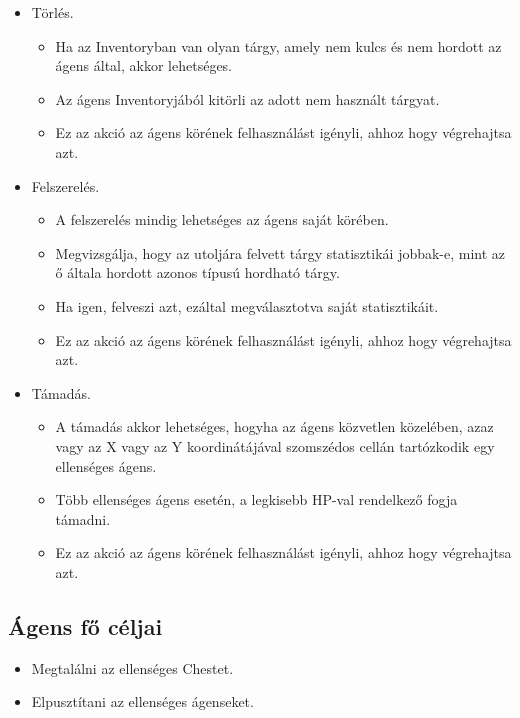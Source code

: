 \begin{itemize}
    \item Törlés. 
    
    \begin{itemize}
        \item Ha az Inventoryban van olyan tárgy, amely nem kulcs és nem hordott az ágens által, akkor lehetséges.
        \item Az ágens Inventoryjából kitörli az adott nem használt tárgyat.
        \item Ez az akció az ágens körének felhasználást igényli, ahhoz hogy végrehajtsa azt.
    \end{itemize}

    \item Felszerelés. 
    
    \begin{itemize}
        \item A felszerelés mindig lehetséges az ágens saját körében.
        \item Megvizsgálja, hogy az utoljára felvett tárgy statisztikái jobbak-e, mint az ő általa hordott azonos típusú hordható tárgy.
        \item Ha igen, felveszi azt, ezáltal megválasztotva saját statisztikáit.
        \item Ez az akció az ágens körének felhasználást igényli, ahhoz hogy végrehajtsa azt.
    \end{itemize}

    \item Támadás. 
    
    \begin{itemize}
        \item A támadás akkor lehetséges, hogyha az ágens közvetlen közelében, azaz vagy az X vagy az Y koordinátájával szomszédos cellán tartózkodik egy ellenséges ágens.
        \item Több ellenséges ágens esetén, a legkisebb HP-val rendelkező fogja támadni.
        \item Ez az akció az ágens körének felhasználást igényli, ahhoz hogy végrehajtsa azt.
    \end{itemize}

\end{itemize}

\subsection{Ágens fő céljai}

\begin{itemize}
    \item Megtalálni az ellenséges Chestet.
    \item Elpusztítani az ellenséges ágenseket.
\end{itemize}

